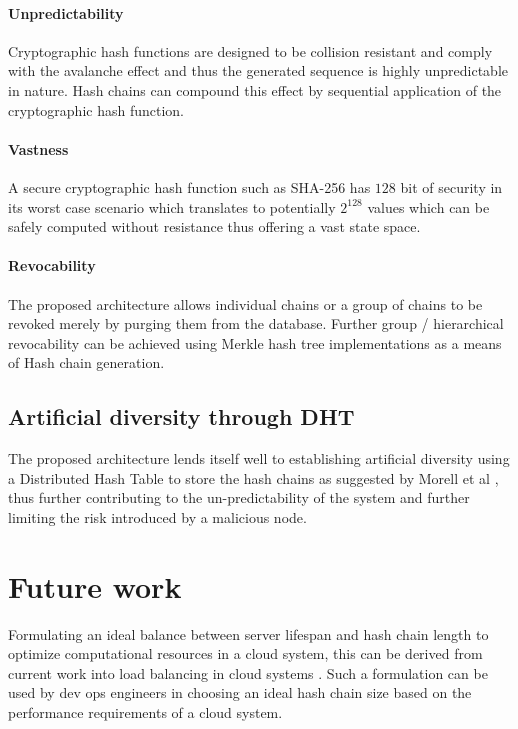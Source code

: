 \documentclass{sig-alternate-05-2015}
\begin{document}
\paragraph*{Unpredictability} Cryptographic hash functions \cite{rogaway_cryptographic_2004} are designed to be collision resistant and comply with the avalanche effect and thus the generated sequence is highly unpredictable in nature. Hash chains can compound this effect by sequential application of the cryptographic hash function.

\paragraph*{Vastness} A secure cryptographic hash function such as SHA-256 has $128$ bit of security in its worst case scenario which translates to potentially $2^{128}$ values which can be safely computed without resistance thus offering a vast state space.

\paragraph*{Revocability} The proposed architecture allows individual chains or a group of chains to be revoked merely by purging them from the database. Further group / hierarchical revocability can be achieved using Merkle hash tree implementations as a means of Hash chain generation.

\subsection*{Artificial diversity through DHT}

The proposed architecture lends itself well to establishing artificial diversity using a Distributed Hash Table to store the hash chains as suggested by Morell et al \cite{morrell_dht_2015}, thus further contributing to the un-predictability of the system and further limiting the risk introduced by a malicious node.

\section*{Future work}

Formulating an ideal balance between server lifespan and hash chain length to optimize computational resources in a cloud system, this can be derived from current work into load balancing in cloud systems \cite{randles_comparative_2010}. Such a formulation can be used by dev ops engineers in choosing an ideal hash chain size based on the performance requirements of a cloud system.
\end{document}
